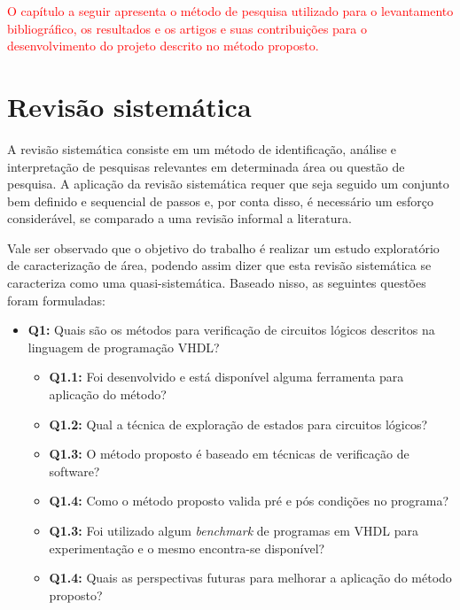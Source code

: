 \label{chapter:correlatos}
\textcolor{red}{O capítulo a seguir apresenta o método de pesquisa utilizado para o levantamento bibliográfico, os resultados e os artigos e suas contribuições para o desenvolvimento do projeto descrito no método proposto.}

\section{Revisão sistemática}
\par
A revisão sistemática consiste em um método de identificação, análise e interpretação de pesquisas relevantes em determinada área ou questão de pesquisa\cite{kitchenham2004procedures}. A aplicação da revisão sistemática requer que seja seguido um conjunto bem definido e sequencial de passos e, por conta disso, é necessário um esforço considerável, se comparado a uma revisão informal a literatura\cite{MafraTravassos}.

\par
Vale ser observado que o objetivo do trabalho é realizar um estudo exploratório de caracterização de área, podendo assim dizer que esta revisão sistemática se caracteriza como uma quasi-sistemática\cite{travassos2008environment}. Baseado nisso, as seguintes questões foram formuladas:
\begin{itemize}
\item \textbf{Q1:} Quais são os métodos para verificação de circuitos lógicos descritos na linguagem de programação VHDL?
	\begin{itemize}
	\item \textbf{Q1.1:} Foi desenvolvido e está disponível alguma ferramenta para aplicação do método?
	\item \textbf{Q1.2:} Qual a técnica de exploração de estados para circuitos lógicos?
	\item \textbf{Q1.3:} O método proposto é baseado em técnicas de verificação de software?
	\item \textbf{Q1.4:} Como o método proposto valida pré e pós condições no programa?
	\item \textbf{Q1.3:} Foi utilizado algum \textit{benchmark} de programas em VHDL para experimentação e o mesmo encontra-se disponível?
	\item \textbf{Q1.4:} Quais as perspectivas futuras para melhorar a aplicação do método proposto?
	\end{itemize}
\end{itemize}

